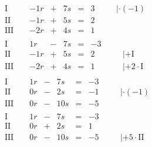 \begin{exercise}
\begin{minipage}[t]{0.49\linewidth}
\begin{equation*}
\begin{split}
    \\[1ex]&
    \begin{array}{r|rrrrrrrl}
      \text{I}{\,} & {\,} & -\num{1}r & + & \num{7}s & = & \num{3} & {\quad} & |\cdot\left(-\num{1}\right) \\
     \text{II}{\,} & {\,} & -\num{1}r & + & \num{5}s & = & \num{2} & {\quad} &                             \\
    \text{III}{\,} & {\,} & -\num{2}r & + & \num{4}s & = & \num{1} & {\quad} &
    \end{array}
    \\[1ex]&
    \begin{array}{r|rrrrrrrl}
      \text{I}{\,} & {\,} &  \num{1}r & - & \num{7}s & = & -\num{3} & {\quad} &                        \\
     \text{II}{\,} & {\,} & -\num{1}r & + & \num{5}s & = &  \num{2} & {\quad} & |+\text{I}             \\
    \text{III}{\,} & {\,} & -\num{2}r & + & \num{4}s & = &  \num{1} & {\quad} & |+\num{2}\cdot\text{I}
    \end{array}
    \\[1ex]&
    \begin{array}{r|rrrrrrrl}
      \text{I}{\,} & {\,} & \num{1}r & - &  \num{7}s & = & -\num{3} & {\quad} &                             \\
     \text{II}{\,} & {\,} & \num{0}r & - &  \num{2}s & = & -\num{1} & {\quad} & |\cdot\left(-\num{1}\right) \\
    \text{III}{\,} & {\,} & \num{0}r & - & \num{10}s & = & -\num{5} & {\quad} &
    \end{array}
    \\[1ex]&
    \begin{array}{r|rrrrrrrl}
      \text{I}{\,} & {\,} & \num{1}r & - &  \num{7}s & = & -\num{3} & {\quad} &                         \\
     \text{II}{\,} & {\,} & \num{0}r & + &  \num{2}s & = &  \num{1} & {\quad} &                         \\
    \text{III}{\,} & {\,} & \num{0}r & - & \num{10}s & = & -\num{5} & {\quad} & |+\num{5}\cdot\text{II}
    \end{array}
    \end{split}
    \end{equation*}
    \end{minipage}\hfill
    \begin{minipage}[t]{0.49\linewidth}

\end{minipage}
\end{exercise}
